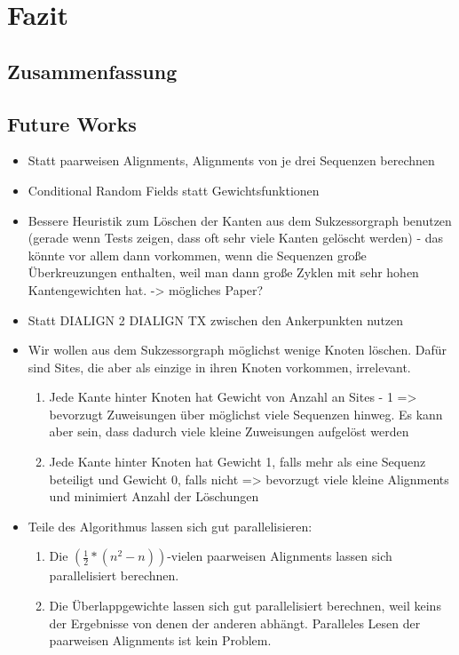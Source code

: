 \chapter{Fazit}
\label{ch:fazit}

\section{Zusammenfassung}

\section{Future Works} \label{sec:fut_work}

\begin{itemize}
	\item Statt paarweisen Alignments, Alignments von je drei Sequenzen berechnen
	\item Conditional Random Fields statt Gewichtsfunktionen
	\item Bessere Heuristik zum Löschen der Kanten aus dem Sukzessorgraph benutzen (gerade wenn Tests zeigen, dass oft sehr viele Kanten gelöscht werden) - das könnte vor allem dann vorkommen, wenn die Sequenzen große Überkreuzungen enthalten, weil man dann große Zyklen mit sehr hohen Kantengewichten hat. -> mögliches Paper?
	\item Statt DIALIGN 2 DIALIGN TX zwischen den Ankerpunkten nutzen
	\item Wir wollen aus dem Sukzessorgraph möglichst wenige Knoten löschen. Dafür sind Sites, die aber als einzige in ihren Knoten vorkommen, irrelevant. 
		\begin{enumerate}
			\item Jede Kante hinter Knoten hat Gewicht von Anzahl an Sites - 1 => bevorzugt Zuweisungen über möglichst viele Sequenzen hinweg. Es kann aber sein, dass dadurch viele kleine Zuweisungen aufgelöst werden
			\item Jede Kante hinter Knoten hat Gewicht 1, falls mehr als eine Sequenz beteiligt und Gewicht 0, falls nicht => bevorzugt viele kleine Alignments und minimiert Anzahl der Löschungen
		\end{enumerate}
	\item Teile des Algorithmus lassen sich gut parallelisieren:
		\begin{enumerate}
			\item Die $(\frac{1}{2}*(n^2-n))$-vielen paarweisen Alignments lassen sich parallelisiert berechnen.
			\item Die Überlappgewichte lassen sich gut parallelisiert berechnen, weil keins der Ergebnisse von denen der anderen abhängt. Paralleles Lesen der paarweisen Alignments ist kein Problem.

\end{enumerate}
\end{itemize}

